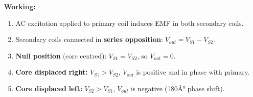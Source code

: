 \documentclass[12pt,a4paper]{article}
\begin{document}
\textbf{Working:}
\begin{enumerate}[label=\textbf{\arabic*.}, leftmargin=*, itemsep=3pt]
  \item AC excitation applied to primary coil induces EMF in both secondary coils.
  \item Secondary coils connected in \textbf{series opposition}: $V_{out} = V_{S1} - V_{S2}$.
  \item \textbf{Null position} (core centred): $V_{S1} = V_{S2}$, so $V_{out} = 0$.
  \item \textbf{Core displaced right:} $V_{S1} > V_{S2}$, $V_{out}$ is positive and in phase with primary.
  \item \textbf{Core displaced left:} $V_{S2} > V_{S1}$, $V_{out}$ is negative (180Â° phase shift).
\end{enumerate}
\end{document}
